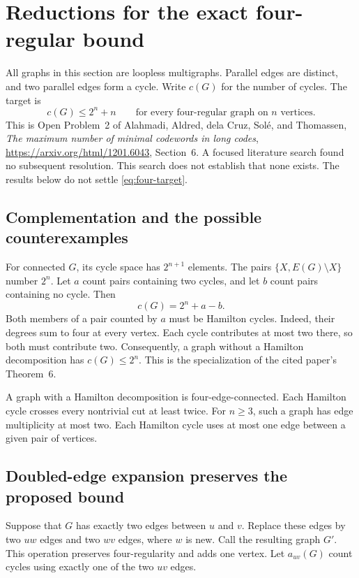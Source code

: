 \section{Reductions for the exact four-regular bound}\label{sec:four-regular}

All graphs in this section are loopless multigraphs.
Parallel edges are distinct, and two parallel edges form a cycle.
Write $c(G)$ for the number of cycles.
The target is
\begin{equation}\label{eq:four-target}
 c(G)\le 2^n+n
 \qquad\text{for every four-regular graph on $n$ vertices.}
\end{equation}
This is Open Problem~2 of Alahmadi, Aldred, dela Cruz, Sol\'e, and Thomassen,
\emph{The maximum number of minimal codewords in long codes},
\url{https://arxiv.org/html/1201.6043}, Section~6.
A focused literature search found no subsequent resolution.
This search does not establish that none exists.
The results below do not settle \eqref{eq:four-target}.

\subsection{Complementation and the possible counterexamples}

For connected $G$, its cycle space has $2^{n+1}$ elements.
The pairs $\{X,E(G)\setminus X\}$ number $2^n$.
Let $a$ count pairs containing two cycles, and let $b$ count pairs containing no cycle.
Then
\[
 c(G)=2^n+a-b.
\]
Both members of a pair counted by $a$ must be Hamilton cycles.
Indeed, their degrees sum to four at every vertex.
Each cycle contributes at most two there, so both must contribute two.
Consequently, a graph without a Hamilton decomposition has $c(G)\le2^n$.
This is the specialization of the cited paper's Theorem~6.

A graph with a Hamilton decomposition is four-edge-connected.
Each Hamilton cycle crosses every nontrivial cut at least twice.
For $n\ge3$, such a graph has edge multiplicity at most two.
Each Hamilton cycle uses at most one edge between a given pair of vertices.

\subsection{Doubled-edge expansion preserves the proposed bound}

Suppose that $G$ has exactly two edges between $u$ and $v$.
Replace these edges by two $uw$ edges and two $wv$ edges, where $w$ is new.
Call the resulting graph $G'$.
This operation preserves four-regularity and adds one vertex.
Let $a_{uv}(G)$ count cycles using exactly one of the two $uv$ edges.


